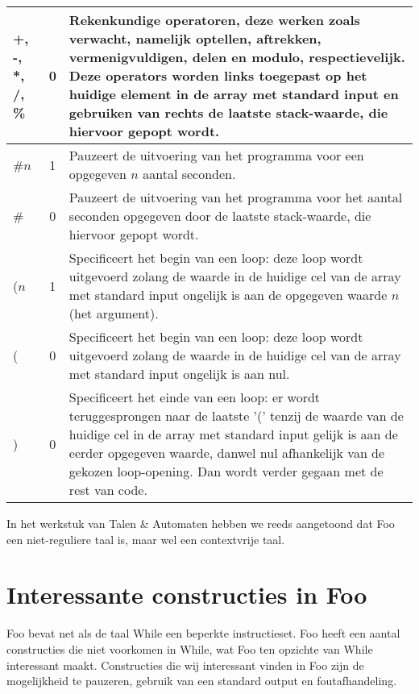\documentclass[11pt]{article}
\begin{document}
\begin{center}
\begin{tabular}{ | l | c | p{12cm} | }
    +, -, *, /, \%                          & 0 & Rekenkundige operatoren, deze werken zoals verwacht, namelijk optellen, aftrekken, vermenigvuldigen, delen en modulo, respectievelijk. Deze operators worden links toegepast op het huidige element in de array met standard input en gebruiken van rechts de laatste stack-waarde, die hiervoor gepopt wordt. \\ \hline
    \#\(n\)                                 & 1 & Pauzeert de uitvoering van het programma voor een opgegeven \(n\) aantal seconden. \\ \hline
    \#                                      & 0 & Pauzeert de uitvoering van het programma voor het aantal seconden opgegeven door de laatste stack-waarde, die hiervoor gepopt wordt. \\ \hline
    (\(n\)                                  & 1 & Specificeert het begin van een loop: deze loop wordt uitgevoerd zolang de waarde in de huidige cel van de array met standard input ongelijk is aan de opgegeven waarde \(n\) (het argument). \\ \hline
    (                                       & 0 & Specificeert het begin van een loop: deze loop wordt uitgevoerd zolang de waarde in de huidige cel van de array met standard input ongelijk is aan nul. \\ \hline
    )                                       & 0 & Specificeert het einde van een loop: er wordt teruggesprongen naar de laatste '(' tenzij de waarde van de huidige cel in de array met standard input gelijk is aan de eerder opgegeven waarde, danwel nul afhankelijk van de gekozen loop-opening. Dan wordt verder gegaan met de rest van code. \\ \hline
    \end{tabular}
\end{center}


In het werkstuk van Talen \& Automaten hebben we reeds aangetoond dat Foo een niet-reguliere taal is, maar wel een contextvrije taal.

\section{Interessante constructies in Foo}

Foo bevat net als de taal While een beperkte instructieset. 
Foo heeft een aantal constructies die niet voorkomen in While, wat Foo ten opzichte van While interessant maakt.
Constructies die wij interessant vinden in Foo zijn de mogelijkheid te pauzeren, gebruik van een standard output en foutafhandeling.
\end{document}
